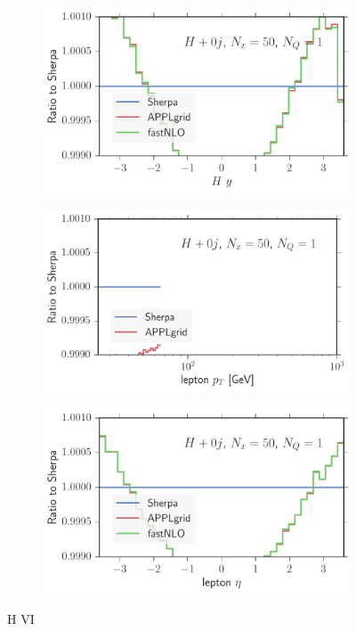 \begin{figure}
\centering
\hfill
\begin{subfigure}[]{0.49\textwidth}
	\includegraphics[width=\textwidth]{images/hvi_hy.pdf}
\end{subfigure}

\begin{subfigure}[]{0.49\textwidth}
	\includegraphics[width=\textwidth]{images/hvi_lpt.pdf}
\end{subfigure}
\hfill
\begin{subfigure}[]{0.49\textwidth}
	\includegraphics[width=\textwidth]{images/hvi_leta.pdf}
\end{subfigure}
\caption{H VI}
\end{figure}

